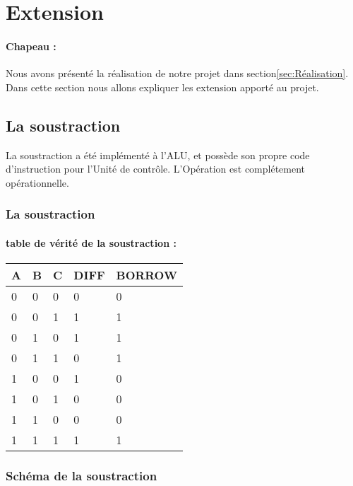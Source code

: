 \section{Extension}
\label{sec:extension}

\paragraph{Chapeau :} Nous avons présenté la réalisation de notre projet dans section\ref{sec:Réalisation}. Dans cette section nous allons expliquer les extension apporté au projet.

\subsection{La soustraction}
\label{sec:soustraction}

La soustraction a été implémenté à l'ALU, et possède son propre code d'instruction pour l'Unité de
contrôle. L'Opération est complétement opérationnelle.

\subsubsection{La soustraction}
\label{sec:sub-soustraction}
\paragraph{table de vérité de la soustraction :}
\begin{center}
\begin{tabular} {|p{0.5cm}|p{0.5cm}|p{0.5cm}|p{1cm}|p{1.7cm}|}
\hline
A & B & C & DIFF & BORROW\\
\hline
0 & 0 & 0 & 0 & 0\\
\hline
0 & 0 & 1 & 1 & 1\\
\hline
0 & 1 & 0 & 1 & 1\\
\hline
0 & 1 & 1 & 0 & 1\\
\hline
1 & 0 & 0 & 1 & 0\\
\hline
1 & 0 & 1 & 0 & 0\\
\hline
1 & 1 & 0 & 0 & 0\\
\hline
1 & 1 & 1 & 1 & 1\\
\hline
\end{tabular}
\end{center}

\subsubsection{Schéma de la soustraction}
\label{sec:schema soustraction}

